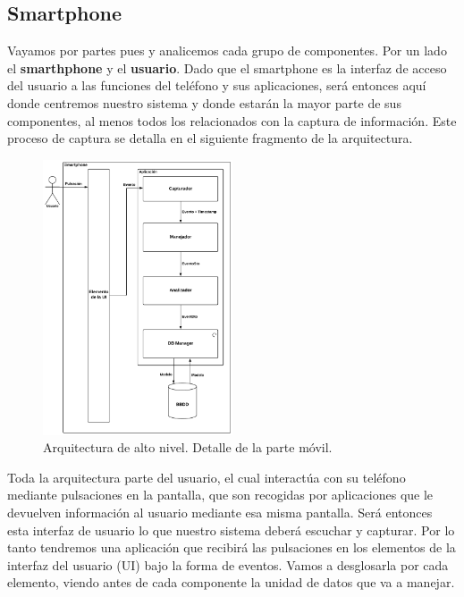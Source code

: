 \documentclass[12pt,a4paper,oneside]{book} %
\begin{document}
\subsection{Smartphone}
Vayamos por partes pues y analicemos cada grupo de componentes. Por un lado el \textbf{smarthphone} y el \textbf{usuario}. Dado que el smartphone es la interfaz de acceso del usuario a las funciones del teléfono y sus aplicaciones, será entonces aquí donde centremos nuestro sistema y donde estarán la mayor parte de sus componentes, al menos todos los relacionados con la captura de información. 
\newline
\newline
Este proceso de captura se detalla en el siguiente fragmento de la arquitectura. 
\begin{figure}[hbt]
  \begin{center} \setlength{\unitlength}{0.0105in}
     \includegraphics[width=0.5\textwidth]{pictures/architecture/highLevelArch02.png}
  \end{center}
  \caption[Arquitectura de alto nivel. Smartphone]{Arquitectura de alto nivel. Detalle de la parte móvil.}
\end{figure}
Toda la arquitectura parte del usuario, el cual interactúa con su teléfono mediante pulsaciones en la pantalla, que son recogidas por aplicaciones que le devuelven información al usuario mediante esa misma pantalla. Será entonces esta interfaz de usuario lo que nuestro sistema deberá escuchar y capturar. Por lo tanto tendremos una aplicación que recibirá las pulsaciones en los elementos de la interfaz del usuario (UI) bajo la forma de eventos. 
\newline
\newline
Vamos a desglosarla por cada elemento, viendo antes de cada componente la unidad de datos que va a manejar.
\newline
\newline
\end{document}
